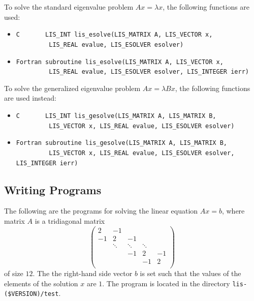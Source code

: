 \documentclass[a4paper]{article}
\begin{document}
To solve the standard eigenvalue problem $Ax = \lambda x$, the following functions are used:
\begin{itemize}
\item \verb|C       LIS_INT lis_esolve(LIS_MATRIX A, LIS_VECTOR x,|\\ 
      \verb|         LIS_REAL evalue, LIS_ESOLVER esolver)|
\item \verb|Fortran subroutine lis_esolve(LIS_MATRIX A, LIS_VECTOR x,|\\
      \verb|         LIS_REAL evalue, LIS_ESOLVER esolver, LIS_INTEGER ierr)|
\end{itemize}
To solve the generalized eigenvalue problem $Ax = \lambda Bx$, the following functions are used instead:
\begin{itemize}
\item \verb|C       LIS_INT lis_gesolve(LIS_MATRIX A, LIS_MATRIX B,|\\ 
      \verb|         LIS_VECTOR x, LIS_REAL evalue, LIS_ESOLVER esolver)|
\item \verb|Fortran subroutine lis_gesolve(LIS_MATRIX A, LIS_MATRIX B,|\\
      \verb|         LIS_VECTOR x, LIS_REAL evalue, LIS_ESOLVER esolver, LIS_INTEGER ierr)|
\end{itemize}

\subsection{Writing Programs}
\label{sec:testprog3}
The following are the programs for solving the linear equation $Ax = b$,
where matrix $A$ is a tridiagonal matrix 
\[
\left(
\begin{array}{ccccc}
2 & -1 &   &  &   \\
-1 & 2 & -1 &  &   \\
  & \ddots  & \ddots  & \ddots  &   \\
  &   & -1 & 2 & -1 \\
  &   &   & -1 & 2 \\
\end{array}
\right)
\]
of size $12$.
The the right-hand side vector $b$ is set such that the values of the elements of the solution $x$ are $1$. 
The program is located in the directory \verb|lis-($VERSION)/test|. 
\end{document}
